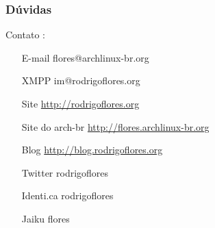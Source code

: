 \documentclass{beamer}
\begin{document}
\begin{frame}
    \frametitle{Dúvidas}
    \begin{block}{Contato :}
        \begin{itemize}
            \centering
            \item[E-mail] flores@archlinux-br.org        
            \item[XMPP]  im@rodrigoflores.org        
            \item[Site]  \url{http://rodrigoflores.org}
            \item[Site do arch-br]  \url{http://flores.archlinux-br.org}
            \item[Blog]  \url{http://blog.rodrigoflores.org}        
            \item[Twitter] rodrigoflores        
            \item[Identi.ca] rodrigoflores        
            \item[Jaiku] flores        
        \end{itemize}
    \end{block}

\end{frame}
\end{document}
